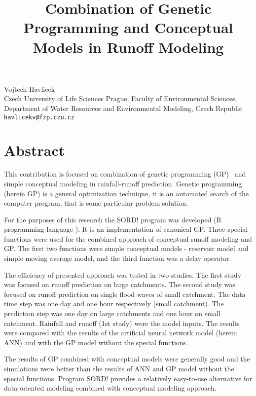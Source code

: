 \title{Combination of Genetic Programming and Conceptual Models in Runoff Modeling }
 \author{} \institute{}
\maketitle
\begin{center}
{\large Vojtech  Havlicek}\\
Czech University of Life Sciences Prague, Faculty of Environmental Sciences, Department of Water Resources and Environmental Modeling, Czech Republic\\
{\tt havlicekv@fzp.czu.cz}

\end{center}

\section*{Abstract}

This contribution is focused on combination of genetic programming (GP)~\cite{GP} and simple conceptual modeling in rainfall-runoff prediction. Genetic programming (herein GP) is a general optimization technique, it is an automated search of the computer program, that is some particular problem solution.

For the purposes of this research the SORD! program was developed (R programming language \cite{R}). It is an implementation of canonical GP.  Three special functions were used for the combined approach of conceptual runoff modeling and GP.
 The first two  functions were simple conceptual models - reservoir model and simple moving average model, and the third function was a delay operator.

The efficiency of presented approach was tested in two studies. The first study was focused on runoff prediction on large catchments. The second study was focused on runoff prediction on single flood waves of small catchment. The data time step was one day and one hour respectively (small catchment). The prediction step was one day on large catchments and one hour on small catchment. Rainfall and runoff (1st study) were the model inputs. The results were compared with the results of the artificial neural network model (herein ANN) and with the GP model without the special functions.

The results of GP combined with conceptual models were generally good and the simulations were better than the results of ANN  and GP model without the special functions. Program SORD! provides a relatively easy-to-use alternative for data-oriented modeling combined with conceptual modeling approach.

